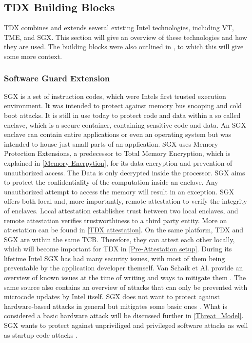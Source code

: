 \subsection{TDX Building Blocks}
\label{sec:tdxBuildingBlocks}
\Gls{TDX} combines and extends several existing Intel technologies, including \Gls{VT}, \Gls{TME}, and \Gls{SGX}. This section will give an overview of these technologies and how they are used. The building blocks were also outlined in \cite{cheng_intel_2023}, to which this will give some more context. 
\subsubsection{Software Guard Extension}
\Gls{SGX} is a set of instruction codes, which were Intels first trusted execution environment. It was intended to protect against memory bus snooping and cold boot attacks. It is still in use today to protect code and data within a so called enclave, which is a secure container, containing sensitive code and data. An SGX enclave can contain entire applications or even an operating system but was intended to house just small parts of an application. SGX uses Memory Protection Extensions, a predecessor to Total Memory Encryption, which is explained in \cref{Memory Encrpytion}, for its data encryption and prevention of unauthorized access. The Data is only decrypted inside the processor\cite{intel_corporation_overview--intel-sgx-enclave_nodate}. \Gls{SGX} aims to protect the confidentiality of the computation inside an enclave. Any unauthorized attempt to access the memory will result in an exception. \Gls{SGX} offers both local and, more importantly, remote attestation to verify the integrity of enclaves. Local attestation establishes trust between two local enclaves, and remote attestation verifies trustworthiness to a third party entity. More on attestation can be found in \cref{TDX attestation}. On the same platform, \Gls{TDX} and SGX are within the same \Gls{TCB}.  Therefore, they can attest each other locally\cite{intel_corporation_dcap_2024-1}, which will become important for \Gls{TDX} in \cref{Pre-Attestation setup}. During its lifetime Intel \Gls{SGX} has had many security issues, with most of them being preventable by the application developer themself. Van Schaik et Al. provide an overview of known issues at the time of writing and ways to mitigate them \cite{sgxfail}. The same source also contains an overview of attacks that can only be prevented with microcode updates by Intel itself. \Gls{SGX} does not want to protect against hardware-based attacks in general but mitigates some basic ones \cite{costan_intel_2016}. What is considered a basic hardware attack will be discussed further in \cref{Threat_Model}. SGX wants to protect against unpriviliged and privileged software attacks as well as startup code attacks \cite{schutz_general_nodate}.
